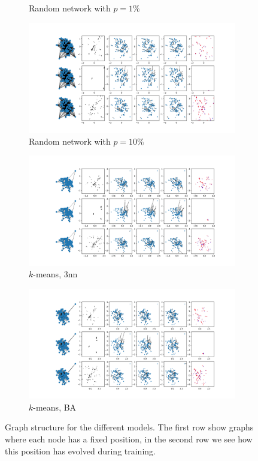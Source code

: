 \documentclass[a4paper,10pt]{article}
\begin{document}
\begin{figure}[htbp]
\begin{subfigure}{0.24\textwidth}
    \caption{Random network with $p=1\%$}
  \end{subfigure}
  \begin{subfigure}{0.24\textwidth}
    \centering
    \includegraphics[trim={0 13.2cm 29cm 0},clip,width=\textwidth]{../results/rn10-100N-noemb0}
    \caption{Random network with $p=10\%$}
  \end{subfigure}
  \begin{subfigure}{0.24\textwidth}
    \centering
    \includegraphics[trim={0 13.2cm 29cm 0},clip,width=\textwidth]{../results/nn-100N-noemb0}
    \caption{$k$-means, 3nn}
  \end{subfigure}
  \begin{subfigure}{0.24\textwidth}
    \centering
    \includegraphics[trim={0 13.2cm 29cm 0},clip,width=\textwidth]{../results/ba-100N-noemb0}
    \caption{$k$-means, BA}
  \end{subfigure}
  \caption{Graph structure for the different models. The first row show graphs where each node has a fixed position, in the second row we see how this position has evolved during training.}
\end{figure}
\end{document}
